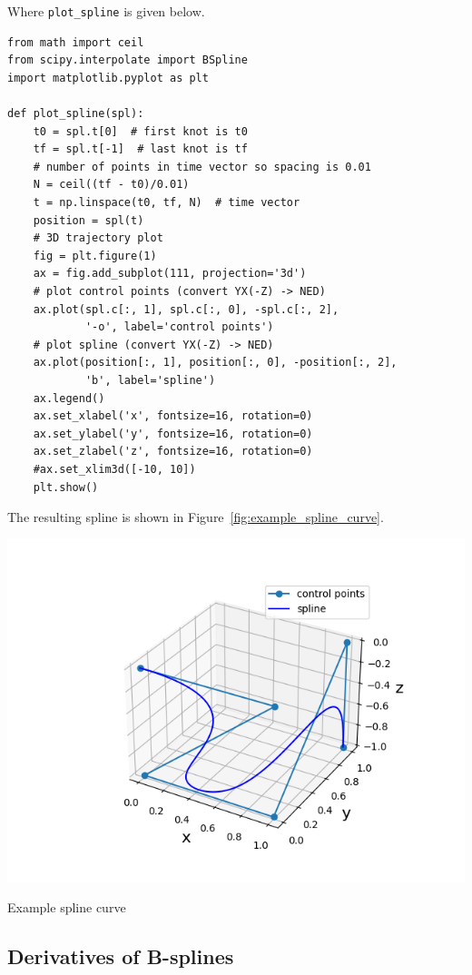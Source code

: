 Where {\tt plot\_spline} is given below.
\begin{lstlisting}
from math import ceil
from scipy.interpolate import BSpline
import matplotlib.pyplot as plt

def plot_spline(spl):
    t0 = spl.t[0]  # first knot is t0
    tf = spl.t[-1]  # last knot is tf
    # number of points in time vector so spacing is 0.01
    N = ceil((tf - t0)/0.01)
    t = np.linspace(t0, tf, N)  # time vector
    position = spl(t)
    # 3D trajectory plot
    fig = plt.figure(1)
    ax = fig.add_subplot(111, projection='3d')
    # plot control points (convert YX(-Z) -> NED)
    ax.plot(spl.c[:, 1], spl.c[:, 0], -spl.c[:, 2],
            '-o', label='control points')
    # plot spline (convert YX(-Z) -> NED)
    ax.plot(position[:, 1], position[:, 0], -position[:, 2],
            'b', label='spline')
    ax.legend()
    ax.set_xlabel('x', fontsize=16, rotation=0)
    ax.set_ylabel('y', fontsize=16, rotation=0)
    ax.set_zlabel('z', fontsize=16, rotation=0)
    #ax.set_xlim3d([-10, 10])
    plt.show()
\end{lstlisting}

The resulting spline is shown in Figure~\ref{fig:example_spline_curve}.
\begin{marginfigure}[0in]
  \includegraphics[width=\linewidth]{./chap5_trajectory_planning/figures/example_spline_curve}
  \caption{Example spline curve}
  \label{fig:example_spline_curve}  
\end{marginfigure}

\subsection{Derivatives of B-splines}


